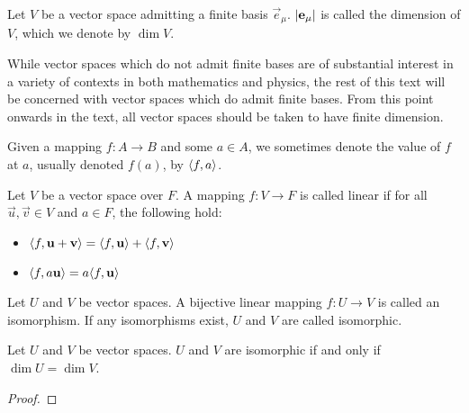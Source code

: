 \documentclass[../main.tex]{subfiles}
\begin{document}
    \begin{definition}[Dimension]
        Let \(V\) be a vector space admitting a finite basis \(\vec{e}_{\mu}\). \(\lvert\mathbf{e}_{\mu}\rvert\) is called the dimension of \(V\), which we denote by \(\dim{V}\).
    \end{definition}

    While vector spaces which do not admit finite bases are of substantial interest in a variety of contexts in both mathematics and physics, the rest of this text will be concerned with vector spaces which do admit finite bases. From this point onwards in the text, all vector spaces should be taken to have finite dimension.

    \begin{notation}[Mappings]
        Given a mapping \(f: A \to B\) and some \(a \in A\), we sometimes denote the value of \(f\) at \(a\), usually denoted \(f(a)\), by \(\langle f,a\rangle\).
    \end{notation}

    \begin{definition}
        Let \(V\) be a vector space over \(F\). A mapping \(f: V \to F\) is called linear if for all \(\vec{u}, \vec{v} \in V\) and \(a \in F\), the following hold:
        \begin{itemize}
            \item\(\langle f,\mathbf{u}+\mathbf{v}\rangle=\langle f,\mathbf{u}\rangle+\langle f,\mathbf{v}\rangle\)
            \item\(\langle f,a\mathbf{u}\rangle=a\langle f,\mathbf{u}\rangle\)
        \end{itemize}
    \end{definition}

    \begin{definition}[Isomorphism]
        Let \(U\) and \(V\) be vector spaces. A bijective linear mapping \(f:U\to{}V\) is called an isomorphism. If any isomorphisms exist, \(U\) and \(V\) are called isomorphic.
    \end{definition}
    
    \begin{theorem}
        Let \(U\) and \(V\) be vector spaces. \(U\) and \(V\) are isomorphic if and only if \(\dim{U} = \dim{V}\).
        \begin{proof}
        \end{proof}
    \end{theorem}
\end{document}
